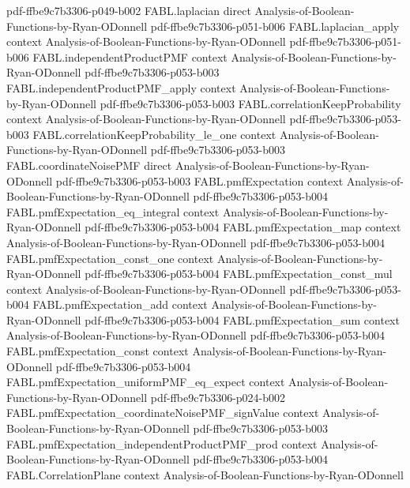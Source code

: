 \begin{theorem}
  {pdf-ffbe9c7b3306-p049-b002}
\proofstep
  {FABL.laplacian}
  {direct}
  {Analysis-of-Boolean-Functions-by-Ryan-ODonnell}
  {pdf-ffbe9c7b3306-p051-b006}
\proofstep
  {FABL.laplacian_apply}
  {context}
  {Analysis-of-Boolean-Functions-by-Ryan-ODonnell}
  {pdf-ffbe9c7b3306-p051-b006}
\proofstep
  {FABL.independentProductPMF}
  {context}
  {Analysis-of-Boolean-Functions-by-Ryan-ODonnell}
  {pdf-ffbe9c7b3306-p053-b003}
\proofstep
  {FABL.independentProductPMF_apply}
  {context}
  {Analysis-of-Boolean-Functions-by-Ryan-ODonnell}
  {pdf-ffbe9c7b3306-p053-b003}
\proofstep
  {FABL.correlationKeepProbability}
  {context}
  {Analysis-of-Boolean-Functions-by-Ryan-ODonnell}
  {pdf-ffbe9c7b3306-p053-b003}
\proofstep
  {FABL.correlationKeepProbability_le_one}
  {context}
  {Analysis-of-Boolean-Functions-by-Ryan-ODonnell}
  {pdf-ffbe9c7b3306-p053-b003}
\proofstep
  {FABL.coordinateNoisePMF}
  {direct}
  {Analysis-of-Boolean-Functions-by-Ryan-ODonnell}
  {pdf-ffbe9c7b3306-p053-b003}
\proofstep
  {FABL.pmfExpectation}
  {context}
  {Analysis-of-Boolean-Functions-by-Ryan-ODonnell}
  {pdf-ffbe9c7b3306-p053-b004}
\proofstep
  {FABL.pmfExpectation_eq_integral}
  {context}
  {Analysis-of-Boolean-Functions-by-Ryan-ODonnell}
  {pdf-ffbe9c7b3306-p053-b004}
\proofstep
  {FABL.pmfExpectation_map}
  {context}
  {Analysis-of-Boolean-Functions-by-Ryan-ODonnell}
  {pdf-ffbe9c7b3306-p053-b004}
\proofstep
  {FABL.pmfExpectation_const_one}
  {context}
  {Analysis-of-Boolean-Functions-by-Ryan-ODonnell}
  {pdf-ffbe9c7b3306-p053-b004}
\proofstep
  {FABL.pmfExpectation_const_mul}
  {context}
  {Analysis-of-Boolean-Functions-by-Ryan-ODonnell}
  {pdf-ffbe9c7b3306-p053-b004}
\proofstep
  {FABL.pmfExpectation_add}
  {context}
  {Analysis-of-Boolean-Functions-by-Ryan-ODonnell}
  {pdf-ffbe9c7b3306-p053-b004}
\proofstep
  {FABL.pmfExpectation_sum}
  {context}
  {Analysis-of-Boolean-Functions-by-Ryan-ODonnell}
  {pdf-ffbe9c7b3306-p053-b004}
\proofstep
  {FABL.pmfExpectation_const}
  {context}
  {Analysis-of-Boolean-Functions-by-Ryan-ODonnell}
  {pdf-ffbe9c7b3306-p053-b004}
\proofstep
  {FABL.pmfExpectation_uniformPMF_eq_expect}
  {context}
  {Analysis-of-Boolean-Functions-by-Ryan-ODonnell}
  {pdf-ffbe9c7b3306-p024-b002}
\proofstep
  {FABL.pmfExpectation_coordinateNoisePMF_signValue}
  {context}
  {Analysis-of-Boolean-Functions-by-Ryan-ODonnell}
  {pdf-ffbe9c7b3306-p053-b003}
\proofstep
  {FABL.pmfExpectation_independentProductPMF_prod}
  {context}
  {Analysis-of-Boolean-Functions-by-Ryan-ODonnell}
  {pdf-ffbe9c7b3306-p053-b004}
\proofstep
  {FABL.CorrelationPlane}
  {context}
  {Analysis-of-Boolean-Functions-by-Ryan-ODonnell}

\end{theorem}
